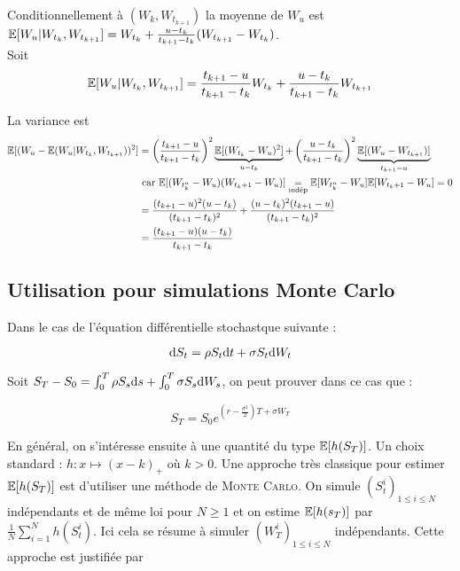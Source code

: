 Conditionnellement à $(W_k, W_{t_{k+1}})$ la moyenne de $W_u$ est $\mathbb{E}[W_u \vert W_{t_k}, W_{t_{k+1}}] = W_{t_k} + \frac{u-t_k}{t_{k+1} - t_k}(W_{t_{k+1}} - W_{t_k})$. \\

Soit 
\begin{equation*}
\begin{split}
  \mathbb{E}[W_u \vert W_{t_k}, W_{t_{k+1}}] = \frac{t_{k+1} - u}{t_{k+1} - t_k} W_{t_k} + \frac{u - t_k}{t_{k+1} -t_k} W_{t_{k+1}}
\end{split}
\end{equation*}

La variance est 
\begin{equation*}
\begin{split}
  \mathbb{E}[(W_u - \mathbb{E}(W_u \vert W_{t_k}, W_{t_{k+1}}))^2] &= \left(\frac{t_{k+1} - u}{t_{k+1}-t_k}\right)^2  \underbrace{\mathbb{E}[(W_{t_k}-W_u)^2]}_{u-t_k} + \left( \frac{u-t_k}{t_{k+1} - t_k} \right)^2 \underbrace{\mathbb{E}[(W_u-W_{t_{k+1}})]}_{t_{k+1} - u} \\
  &\text{ car } \mathbb{E}[(W_{t_k^n} - W_u)(W_{t_k+1} - W_u)] \underset{\text{indép}}{=} \mathbb{E}[W_{t_k^n} - W_u]\mathbb{E}[W_{t_k+1} - W_u] = 0 \\ 
  &= \frac{(t_{k+1}-u)^2 (u-t_k)}{(t_{k+1} - t_k)^2} + \frac{(u-t_k)^2 (t_{k+1}-u)}{(t_{k+1} - t_k)^2} \\
  &= \frac{(t_{k+1}-u)(u-t_k)}{t_{k+1} - t_k}
\end{split}
\end{equation*}

\subsection{Utilisation pour simulations Monte Carlo}
Dans le cas de l'équation différentielle stochastque suivante :

\[ \mathrm{d} S_t = \rho S_t \mathrm{d} t + \sigma S_t \mathrm{d} W_t \]

Soit $S_T - S_0 = \int_{0}^{T} \rho S_s \mathrm{d} s + \int_{0}^{T} \sigma S_s \mathrm{d} W_s$, on peut prouver dans ce cas que :

\[ S_T = S_0 e^{\left(r- \frac{\sigma^2}{2}\right)T + \sigma W_T} \]

En général, on s'intéresse ensuite à une quantité du type $\mathbb{E}[h(S_T)]$. Un choix standard : $h : x \mapsto (x-k)_+$ où $k>0$. Une approche très classique pour estimer $\mathbb{E}[h(S_T)]$ est d'utiliser une méthode de \textsc{Monte Carlo}. On simule $(S_t^i)_{1\leq i \leq N}$ indépendants et de même loi pour $N \geq 1$ et on estime $\mathbb{E}[h(s_T)]$ par $ \frac{1}{N} \sum_{i=1}^{N} h(S_t^i)$. Ici cela se résume à simuler $(W_T^i)_{1 \leq i \leq N}$ indépendants. Cette approche est justifiée par 

